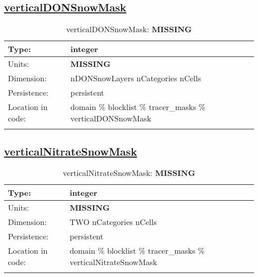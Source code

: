 \subsection[verticalDONSnowMask]{\hyperref[sec:var_tab_tracer_masks]{verticalDONSnowMask}}
\label{subsec:var_sec_tracer_masks_verticalDONSnowMask}
\begin{center}
\begin{longtable}{| p{2.0in} | p{4.0in} |}
        \hline 
        Type: & integer \\
        \hline 
        Units: & {\bf \color{red} MISSING} \\
        \hline 
        Dimension: & nDONSnowLayers nCategories nCells \\
        \hline 
        Persistence: & persistent \\
        \hline 
         Location in code: & domain \% blocklist \% tracer\_masks \% verticalDONSnowMask \\
         \hline 
    \caption{verticalDONSnowMask: {\bf \color{red} MISSING}}
\end{longtable}
\end{center}
\subsection[verticalNitrateSnowMask]{\hyperref[sec:var_tab_tracer_masks]{verticalNitrateSnowMask}}
\label{subsec:var_sec_tracer_masks_verticalNitrateSnowMask}
\begin{center}
\begin{longtable}{| p{2.0in} | p{4.0in} |}
        \hline 
        Type: & integer \\
        \hline 
        Units: & {\bf \color{red} MISSING} \\
        \hline 
        Dimension: & TWO nCategories nCells \\
        \hline 
        Persistence: & persistent \\
        \hline 
         Location in code: & domain \% blocklist \% tracer\_masks \% verticalNitrateSnowMask \\
         \hline 
    \caption{verticalNitrateSnowMask: {\bf \color{red} MISSING}}
\end{longtable}
\end{center}
